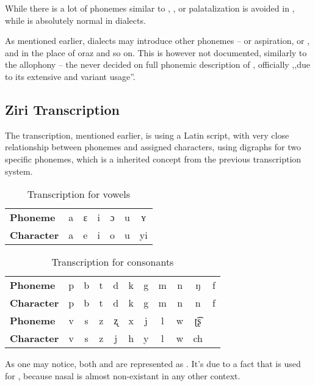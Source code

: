 While there is a lot of phonemes similar to , , or 
palatalization is avoided in , while is absolutely normal in
dialects.

As mentioned earlier, dialects may introduce other phonemes --  or
aspiration,  or ,  and  in the place of  oraz
 and so on. This is however not documented, similarly to the allophony --
the  never decided on
full phonemic description of \andro, officially ,,due to its extensive and
variant usage''.

\subsection{Ziri Transcription}

The  transcription, mentioned earlier, is using a Latin script,
with very close relationship between phonemes and assigned characters, using
digraphs for two specific phonemes, which is a inherited concept from the
previous transcription system.

\begin{table}[ht]
    \centering
    \caption{Transcription for vowels}
    \begin{tabular}{llccccc}
        \textbf{Phoneme}   & a & ɛ & i & ɔ & u & ʏ  \\
        \textbf{Character} & a & e & i & o & u & yi
    \end{tabular}
    \label{tab:phonemes}
\end{table}

\begin{table}[ht]
    \centering
    \caption{Transcription for consonants}
    \begin{tabular}{lcccccccccc}
        \textbf{Phoneme}   & p & b & t & d & k & g & m & n & ŋ  & f \\
        \textbf{Character} & p & b & t & d & k & g & m & n & n  & f \\
        \textbf{Phoneme}   & v & s & z & ʐ & x & j & l & w & ʈ͡ʂ     \\
        \textbf{Character} & v & s & z & j & h & y & l & w & ch
    \end{tabular}
    \label{tab:chars}
\end{table}

As one may notice, both  and  are represented as . It's due to
a fact that  is used for , because nasal  is almost
non-existant in any other context.

